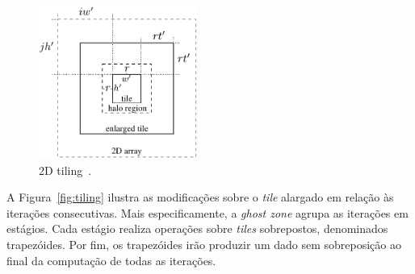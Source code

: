 \begin{figure}[!h]
  \begin{minipage}[b]{0.9\textwidth}
	\centering
	\includegraphics[height=5cm]{figs/tile.pdf}
	\caption{2D tiling~\cite{Rocha:2017}.}
	\label{fig:gputile}
  \end{minipage}
\end{figure}




%
A Figura~\ref{fig:tiling} ilustra as modificações sobre o \textit{tile} alargado
em relação às iterações consecutivas. Mais especificamente, a \textit{ghost zone}
agrupa as iterações em estágios. Cada estágio realiza
operações sobre \textit{tiles} sobrepostos, denominados trapezóides.
Por fim, os trapezóides irão produzir um dado sem sobreposição ao final da
computação de todas as iterações.

